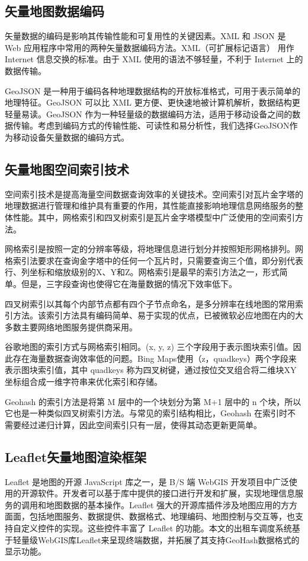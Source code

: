 \subsection{矢量地图数据编码}
矢量数据的编码是影响其传输性能和可复用性的关键因素。XML 和 JSON 是 Web 应用程序中常用的两种矢量数据编码方法。XML（可扩展标记语言） 用作 Internet 信息交换的标准。由于 XML 使用的语法不够轻量，不利于 Internet 上的数据传输。

GeoJSON 是一种用于编码各种地理数据结构的开放标准格式，可用于表示简单的地理特征。GeoJSON 可以比 XML 更方便、更快速地被计算机解析，数据结构更轻量易读。GeoJSON 作为一种轻量级的数据编码方法，适用于移动设备之间的数据传输。考虑到编码方式的传输性能、可读性和易分析性，我们选择GeoJSON作为移动设备矢量数据的编码方式。
\subsection{矢量地图空间索引技术}
空间索引技术是提高海量空间数据查询效率的关键技术。空间索引对瓦片金字塔的地理数据进行管理和维护具有重要的作用，其性能直接影响地理信息网络服务的整体性能。其中，网格索引和四叉树索引是瓦片金字塔模型中广泛使用的空间索引方法。\par
网格索引是按照一定的分辨率等级，将地理信息进行划分并按照矩形网格排列。网格索引法要求在查询金字塔中的任何一个瓦片时，只需要查询三个值，即分别代表行、列坐标和缩放级别的X、Y和Z。网格索引是最早的索引方法之一，形式简单。但是，三字段查询也使得它在海量数据的情况下效率低下。\par
四叉树索引以其每个内部节点都有四个子节点命名，是多分辨率在线地图的常用索引方法。该索引方法具有编码简单、易于实现的优点，已被微软必应地图在内的大多数主要网络地图服务提供商采用。\par
谷歌地图的索引方式与网格索引相同。(x, y, z) 三个字段用于表示图块索引值。因此存在海量数据查询效率低的问题。Bing Maps使用（z，quadkeys）两个字段来表示图块索引值，其中 quadkeys 称为四叉树键，通过按位交叉组合将二维块XY坐标组合成一维字符串来优化索引和存储。\par
Geohash 的索引方法是将第 M 层中的一个块划分为第 M+1 层中的 n 个块，所以它也是一种类似四叉树索引方法。与常见的索引结构相比，Geohash 在索引时不需要经过递归计算，因此空间索引只有一层，使得其动态更新更简单。

\subsection{Leaflet矢量地图渲染框架}
Leaflet 是地图的开源 JavaScript 库之一，是 B/S 端 WebGIS 开发项目中广泛使用的开源软件。开发者可以基于库中提供的接口进行开发和扩展，实现地理信息服务的调用和地图数据的基本操作。Leaflet 强大的开源库插件涉及地图应用的方方面面，包括地图服务、数据提供、数据格式、地理编码、地图控制与交互等，也支持自定义控件的实现。这些控件丰富了 Leaflet  的功能。本文的出租车调度系统基于轻量级WebGIS库Leaflet来呈现终端数据，并拓展了其支持GeoHash数据格式的显示功能。

